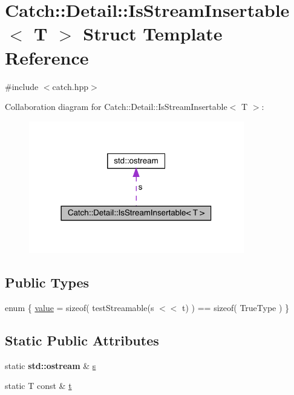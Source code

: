 \hypertarget{struct_catch_1_1_detail_1_1_is_stream_insertable}{}\section{Catch\+:\+:Detail\+:\+:Is\+Stream\+Insertable$<$ T $>$ Struct Template Reference}
\label{struct_catch_1_1_detail_1_1_is_stream_insertable}


{\ttfamily \#include $<$catch.\+hpp$>$}



Collaboration diagram for Catch\+:\+:Detail\+:\+:Is\+Stream\+Insertable$<$ T $>$\+:
\nopagebreak
\begin{figure}[H]
\begin{center}
\leavevmode
\includegraphics[width=266pt]{struct_catch_1_1_detail_1_1_is_stream_insertable__coll__graph}
\end{center}
\end{figure}
\subsection*{Public Types}
\begin{DoxyCompactItemize}
\item 
enum \{ \hyperlink{struct_catch_1_1_detail_1_1_is_stream_insertable_a2e4508694da3bf368ff67733a7970edda765a324929702bfce2969fc19fc4f926}{value} = sizeof( test\+Streamable(s $<$$<$ t) ) == sizeof( True\+Type )
 \}
\end{DoxyCompactItemize}
\subsection*{Static Public Attributes}
\begin{DoxyCompactItemize}
\item 
static \textbf{ std\+::ostream} \& \hyperlink{struct_catch_1_1_detail_1_1_is_stream_insertable_abe3d3c8e5d85665747faafffc9a96b00}{s}
\item 
static T const  \& \hyperlink{struct_catch_1_1_detail_1_1_is_stream_insertable_a7d2a3da978b6736667a7b2f6d51f507f}{t}
\end{DoxyCompactItemize}



